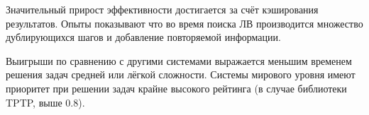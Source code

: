 Значительный прирост эффективности достигается за счёт кэширования результатов. Опыты показывают что во время поиска ЛВ производится множество дублирующихся шагов и добавление повторяемой информации.

Выигрыши по сравнению с другими системами выражается меньшим временем решения задач средней или лёгкой сложности. Системы мирового уровня имеют приоритет при решении задач крайне высокого рейтинга (в случае библиотеки TPTP, выше 0.8).



